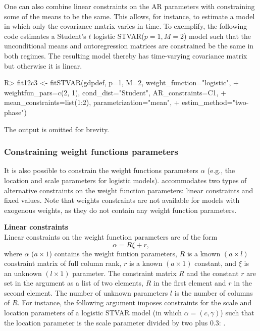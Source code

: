 \documentclass[nojss]{jss}
\begin{document}
One can also combine linear constraints on the AR parameters with constraining some of the means to be the same. This allows, for instance, to estimate a model in which only the covariance matrix varies in time. To exemplify, the following code estimates a Student's $t$ logistic STVAR($p=1, M=2$) model such that the unconditional means and autoregression matrices are constrained be the same in both regimes. The resulting model thereby has time-varying covariance matrix but otherwise it is linear.
%
\begin{CodeChunk}
\begin{CodeInput}
R> fit12c3 <- fitSTVAR(gdpdef, p=1, M=2, weight_function="logistic",
+    weightfun_pars=c(2, 1), cond_dist="Student", AR_constraints=C1,
+    mean_constraints=list(1:2), parametrization="mean",
+    estim_method="two-phase")
\end{CodeInput}
\end{CodeChunk}
%
The output is omitted for brevity.

\subsubsection{Constraining weight functions parameters}

It is also possible to constrain the weight functions parameters $\alpha$ (e.g., the location and scale parameters for logistic models).  accommodates two types of alternative constraints on the weight function parameters: linear constraints and fixed values. Note that weights constraints are not available for models with exogenous weights, as they do not contain any weight function parameters.

\textbf{Linear constraints}\\
Linear constraints on the weight function parameters are of the form
\begin{equation}
\alpha = R\xi + r,
\end{equation}
where $\alpha$ ($a \times 1$) contains the weight funtion parameters, $R$ is a known $(a \times l)$ constraint matrix of full column rank, $r$ is a known $(a \times 1)$ constant, and $\xi$ is an unknown $(l \times 1)$ parameter. The constraint matrix $R$ and the constant $r$ are set in the argument  as a list of two elements, $R$ in the first element and $r$ in the second element. The number of unknown parameters $l$ is the number of columns of $R$. For instance, the following argument imposes constraints for the scale and location parameters of a logistic STVAR model (in which $\alpha = (c,\gamma)$) such that the location parameter is the scale parameter divided by two plus $0.3$: .
\end{document}
